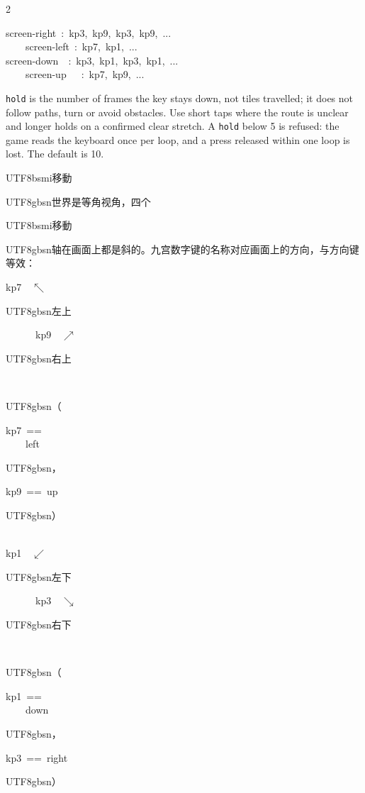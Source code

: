 \begin{paracol}{2}
{\ttfamily\scriptsize\raggedright\noindent screen-right\ :\ kp3,\ kp9,\ kp3,\ kp9,\ ...\ \ \ \ \ \\\ \ \ \ screen-left\ :\ kp7,\ kp1,\ ...\\screen-down\ \ :\ kp3,\ kp1,\ kp3,\ kp1,\ ...\ \ \ \ \ \\\ \ \ \ screen-up\ \ \ :\ kp7,\ kp9,\ ...\par}
\texttt{hold} is the number of frames the key stays down, not tiles travelled; it does not follow paths, turn or avoid obstacles. Use short taps where the route is unclear and longer holds on a confirmed clear stretch. A \texttt{hold} below 5 is refused: the game reads the keyboard once per loop, and a press released within one loop is lost. The default is 10.\par
\switchcolumn
\footnotesize\setlength{\parskip}{2pt}
{\footnotesize\bfseries \begin{CJK}{UTF8}{bsmi}移動\end{CJK}\par}
\begin{CJK}{UTF8}{gbsn}世界是等角视角，四个\end{CJK}\begin{CJK}{UTF8}{bsmi}移動\end{CJK}\begin{CJK}{UTF8}{gbsn}轴在画面上都是斜的。九宫数字键的名称对应画面上的方向，与方向键等效：\end{CJK}\par
{\ttfamily\scriptsize\raggedright\noindent kp7\ \ $\nwarrow$\ \begin{CJK}{UTF8}{gbsn}左上\end{CJK}\ \ \ \ \ \ kp9\ \ $\nearrow$\ \begin{CJK}{UTF8}{gbsn}右上\end{CJK}\ \ \ \ \ \ \ \ \begin{CJK}{UTF8}{gbsn}（\end{CJK}kp7\ ==\\\ \ \ \ left\begin{CJK}{UTF8}{gbsn}，\end{CJK}kp9\ ==\ up\begin{CJK}{UTF8}{gbsn}）\end{CJK}\\kp1\ \ $\swarrow$\ \begin{CJK}{UTF8}{gbsn}左下\end{CJK}\ \ \ \ \ \ kp3\ \ $\searrow$\ \begin{CJK}{UTF8}{gbsn}右下\end{CJK}\ \ \ \ \ \ \ \ \begin{CJK}{UTF8}{gbsn}（\end{CJK}kp1\ ==\\\ \ \ \ down\begin{CJK}{UTF8}{gbsn}，\end{CJK}kp3\ ==\ right\begin{CJK}{UTF8}{gbsn}）\end{CJK}\par}

\end{paracol}
